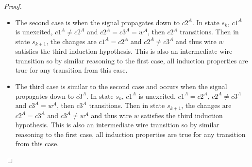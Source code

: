 \documentclass[12pt]{report}
\begin{document}
\begin{proof}
\begin{itemize}
\item The second case is when the signal propagates down to $c2^A$.  In state $s_k$, $c1^A$ is unexcited, $c1^{A}\neq c2^{A}$ and $c2^A=c3^A=w^A$, then $c2^A$ transitions.  
Then in state $s_{k+1}$, the changes are $c1^A=c2^A$ and $c2^{A}\neq c3^{A}$ and thus wire $w$ satisfies the third induction hypothesis.  This is also an intermediate wire transition so by similar reasoning to the first case, all induction properties are true for any transition from this case.   
\item The third case is similar to the second case and occurs when the signal propagates down to $c3^A$.  In state $s_k$, $c1^A$ is unexcited, $c1^A=c2^A$, $c2^{A}\neq c3^{A}$ and $c3^A=w^A$, then $c3^A$ transitions.  
Then in state $s_{k+1}$, the changes are $c2^A=c3^A$ and $c3^{A}\neq w^{A}$ and thus wire $w$ satisfies the third induction hypothesis.  This is also an intermediate wire transition so by similar reasoning to the first case, all induction properties are true for any transition from this case.   


\end{itemize}
\end{proof}
\end{document}
